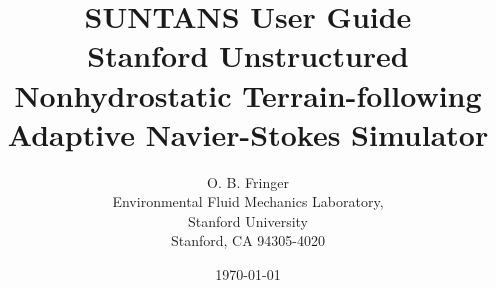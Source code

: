 \documentclass[12pt,oneside]{article}
\begin{document}

\title{SUNTANS User Guide\\
{\large Stanford Unstructured Nonhydrostatic 
Terrain-following Adaptive Navier-Stokes Simulator}}
\author{O. B. Fringer\\
\small
Environmental Fluid Mechanics Laboratory,  \\
Stanford University\\
Stanford, CA 94305-4020
\normalsize}
\date{\today}

\maketitle

\tableofcontents
\clearpage












\end{document}
